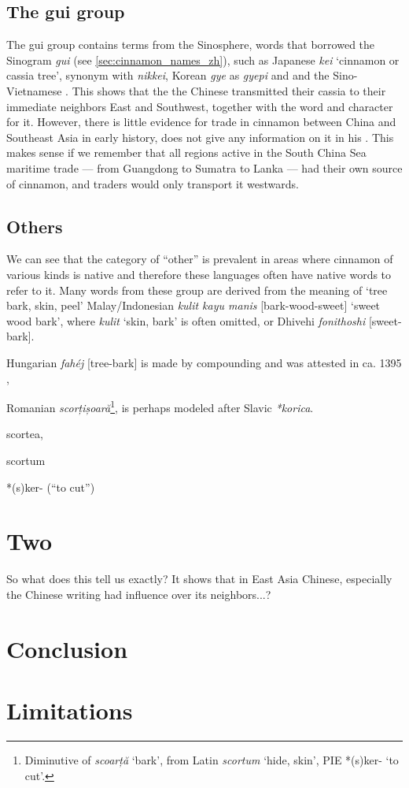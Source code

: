 \subsection{The gui group}

The gui group contains terms from the Sinosphere, words that borrowed the Sinogram  \textit{gui} (see \cref{sec:cinnamon_names_zh}), such as Japanese  \textit{kei} `cinnamon or cassia tree', synonym with  \textit{nikkei}, Korean  \textit{gye} as  \textit{gyepi} and  and the Sino-Vietnamese . This shows that the the Chinese transmitted their cassia to their immediate neighbors East and Southwest, together with the word and character for it. However, there is little evidence for trade in cinnamon between China and Southeast Asia in early history, \textcite{wang_nanhai_1958} does not give any information on it in his . \autocite{wang_nanhai_1958} This makes sense if we remember that all regions active in the South China Sea maritime trade --- from Guangdong to Sumatra to Lanka --- had their own source of cinnamon, and traders would only transport it westwards.


\subsection{Others}

We can see that the category of ``other'' is prevalent in areas where cinnamon of various kinds is native and therefore these languages often have native words to refer to it. Many words from these group are derived from the meaning of `tree bark, skin, peel' Malay/Indonesian \textit{kulit kayu manis} [bark-wood-sweet] `sweet wood bark', where \textit{kulit} `skin, bark' is often omitted, or Dhivehi \textit{fonithoshi} [sweet-bark]. 



Hungarian \textit{fahéj} [tree-bark] is made by compounding and was attested in ca. 1395 \parencite[s.v. fahéj]{zaicz_etimologiai_2006},

Romanian \textit{scorțișoară}\footnote{Diminutive of \textit{scoarță} `bark', from Latin \textit{scortum} `hide, skin', PIE *(s)ker- `to cut'.}, is perhaps modeled after Slavic \textit{*korica}.

scortea,

scortum

*(s)ker- (“to cut”)



\section{Two}

So what does this tell us exactly? It shows that in East Asia Chinese, especially the Chinese writing had influence over its neighbors...?






\section{Conclusion}


\section{Limitations}

